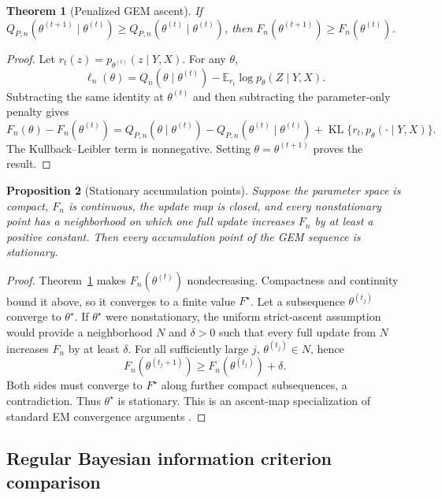 \documentclass[a4paper,fleqn]{cas-sc}
\newtheorem{theorem}{Theorem}[section]
\newtheorem{proposition}[theorem]{Proposition}
\DeclareMathOperator{\KL}{KL}
\newcommand{\E}{\mathbb E}
\numberwithin{equation}{section}
\begin{document}
\begin{theorem}[Penalized GEM ascent]
\label{supp:thm-gem}
If $Q_{P,n}(\theta^{(t+1)}\mid\theta^{(t)})
\geq Q_{P,n}(\theta^{(t)}\mid\theta^{(t)})$, then
$F_n(\theta^{(t+1)})\geq F_n(\theta^{(t)})$.
\end{theorem}

\begin{proof}
Let $r_t(z)=p_{\theta^{(t)}}(z\mid Y,X)$. For any $\theta$,
\[
 \ell_n(\theta)
 =Q_n(\theta\mid\theta^{(t)})
 -\E_{r_t}\log p_\theta(Z\mid Y,X).
\]
Subtracting the same identity at $\theta^{(t)}$ and then subtracting the parameter-only penalty gives
\[
 F_n(\theta)-F_n(\theta^{(t)})
 =Q_{P,n}(\theta\mid\theta^{(t)})
 -Q_{P,n}(\theta^{(t)}\mid\theta^{(t)})
 +\KL\{r_t,p_\theta(\cdot\mid Y,X)\}.
\]
The Kullback--Leibler term is nonnegative. Setting $\theta=\theta^{(t+1)}$ proves the result.
\end{proof}

\begin{proposition}[Stationary accumulation points]
\label{supp:prop-stationary}
Suppose the parameter space is compact, $F_n$ is continuous, the update map is closed, and every nonstationary point has a neighborhood on which one full update increases $F_n$ by at least a positive constant. Then every accumulation point of the GEM sequence is stationary.
\end{proposition}

\begin{proof}
Theorem~\ref{supp:thm-gem} makes $F_n(\theta^{(t)})$ nondecreasing. Compactness and continuity bound it above, so it converges to a finite value $F^\star$. Let a subsequence $\theta^{(t_j)}$ converge to $\theta^\star$. If $\theta^\star$ were nonstationary, the uniform strict-ascent assumption would provide a neighborhood $N$ and $\delta>0$ such that every full update from $N$ increases $F_n$ by at least $\delta$. For all sufficiently large $j$, $\theta^{(t_j)}\in N$, hence
\[
 F_n(\theta^{(t_j+1)})\geq F_n(\theta^{(t_j)})+\delta.
\]
Both sides must converge to $F^\star$ along further compact subsequences, a contradiction. Thus $\theta^\star$ is stationary. This is an ascent-map specialization of standard EM convergence arguments \citep{wu1983convergence}.
\end{proof}

\subsection{Regular Bayesian information criterion comparison}
\end{document}
